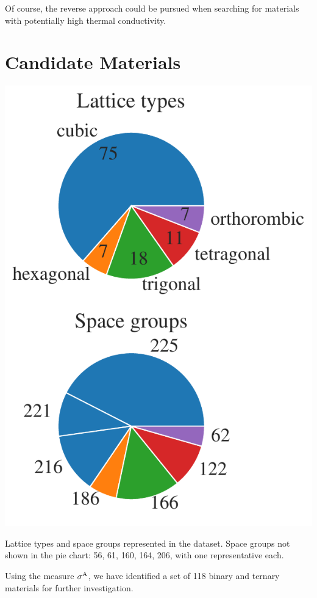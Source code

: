Of course, the reverse approach could be pursued when searching for materials with potentially high thermal conductivity.

\section{Candidate Materials}
\begin{marginfigure}
	\includegraphics[width=\textwidth]{./data/plots/dataset/pies.pdf}
	\caption{
		Lattice types and space groups represented in the dataset. Space groups not shown in the pie chart: 56, 61, 160, 164, 206, with one representative each.
	}
	\label{fig:anh.pie}
\end{marginfigure}
Using the measure $\sigma^\mathrm{A}$, we have identified a set of 118 binary and ternary materials for further investigation.  %
